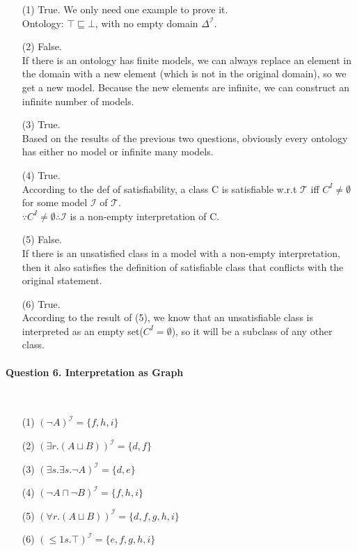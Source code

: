 \documentclass[12pt]{article}
\begin{document}
    \begin{enumerate}
        \item[(1)]
        True. We only need one example to prove it. \\
        Ontology: $\top \sqsubseteq \bot$, with no empty domain $\Delta^{\mathcal{I}}$.
        \item[(2)]
        False. \\
        If there is an ontology has finite models, we can always replace an element in the domain with a new element (which is not in the original domain), so we get a new model.
        Because the new elements are infinite, we can construct an infinite number of models.
        \item[(3)] 
        True. \\
        Based on the results of the previous two questions, obviously every ontology has either no model or infinite many models.
        \item[(4)]  
        True. \\
        According to the def of satisfiability, a class C is satisfiable w.r.t $\mathcal{T}$ iff
        $C^{I} \neq \emptyset$ for some model $\mathcal{I}$ of $\mathcal{T}$. \\
        $\because C^{I} \neq \emptyset \therefore \mathcal{I}$ is a non-empty interpretation of C.
        \item[(5)]
        False. \\
        If there is an unsatisfied class in a model with a non-empty interpretation, then it also satisfies the definition
        of satisfiable class that conflicts with the original statement.
        \item[(6)]
        True. \\
        According to the result of (5),   we know that an unsatisfiable class is interpreted as an empty set($C^{I} = \emptyset$), so it will be a subclass of any other class.
    \end{enumerate}

    \paragraph{Question 6. Interpretation as Graph}~{}
    \\

    \begin{enumerate}
        \item[(1)]
        $(\lnot A)^{\mathcal{I}} = \{ f, h, i \}$
        \item[(2)] 
        $(\exists r.(A \sqcup B))^{\mathcal{I}} = \{ d, f \}$
        \item[(3)] 
        $(\exists s.\exists s.\lnot A)^{\mathcal{I}} = \{ d, e \}$
        \item[(4)] 
        $(\lnot A \sqcap \lnot B)^{\mathcal{I}} = \{ f, h, i \}$
        \item[(5)]
        $(\forall r.(A \sqcup B))^{\mathcal{I}} = \{ d, f, g, h, i \}$
        \item[(6)]
        $(\le 1s.\top)^{\mathcal{I}} = \{ e, f, g, h, i \}$
    \end{enumerate}
\end{document}
